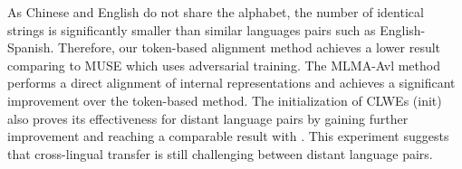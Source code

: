 \documentclass[11pt,a4paper]{article}
\begin{document}
	As Chinese and English do not share the alphabet, the number of identical strings is significantly smaller than similar languages pairs such as English-Spanish. Therefore, our token-based alignment method achieves a lower result comparing to MUSE which uses adversarial training. The MLMA-Avl method performs a direct alignment of internal representations and achieves a significant improvement over the token-based method. The initialization of CLWEs (init) also proves its effectiveness for distant language pairs by gaining further improvement and reaching a comparable result with . This experiment suggests that cross-lingual transfer is still challenging between distant language pairs.
	
	
	
\end{document}
